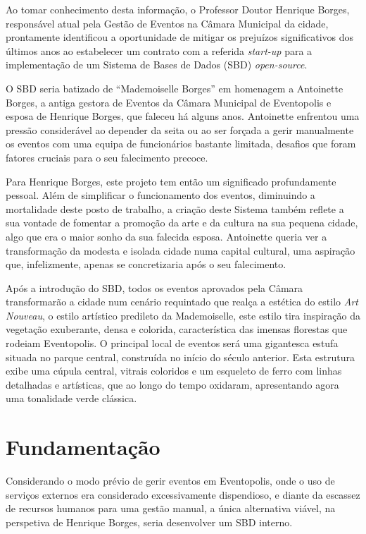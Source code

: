 \documentclass[a4paper,12pt]{scrreprt}
\begin{document}
     Ao tomar conhecimento desta informação, o Professor Doutor Henrique Borges, responsável atual
     pela Gestão de Eventos na Câmara Municipal da cidade, prontamente identificou a
     oportunidade de mitigar os prejuízos significativos dos últimos anos ao estabelecer
     um contrato com a referida \textit{start-up} para a implementação de um Sistema de Bases de Dados (SBD) \textit{open-source}.
    
     O SBD seria batizado de ``Mademoiselle Borges'' em homenagem
     a Antoinette Borges, a antiga gestora de Eventos da Câmara Municipal de Eventopolis
     e esposa de Henrique Borges, que faleceu há alguns anos. Antoinette enfrentou uma pressão
     considerável ao depender da seita ou ao ser forçada a gerir manualmente os eventos com uma
     equipa de funcionários bastante limitada, desafios que foram fatores cruciais para o seu falecimento precoce.
   
     Para Henrique Borges, este projeto tem então um significado profundamente pessoal.
     Além de simplificar o funcionamento dos eventos, diminuindo a mortalidade deste posto de trabalho,
     a criação deste Sistema também reflete a sua vontade de fomentar a promoção da arte e da cultura
     na sua pequena cidade, algo que era o maior sonho da sua falecida esposa.
     Antoinette queria ver a transformação da modesta e isolada cidade numa capital cultural,
     uma aspiração que, infelizmente, apenas se concretizaria após o seu falecimento.
    
     Após a introdução do SBD, todos os eventos aprovados pela Câmara transformarão
     a cidade num cenário requintado que realça a estética do estilo \textit{Art Nouveau},
     o estilo artístico predileto da Mademoiselle, este estilo tira inspiração da vegetação exuberante,
     densa e colorida, característica das imensas florestas que rodeiam Eventopolis.
     O principal local de eventos será uma gigantesca estufa situada no parque central,
     construída no início do século anterior. Esta estrutura exibe uma cúpula central, vitrais coloridos
     e um esqueleto de ferro com linhas detalhadas e artísticas, que ao longo do tempo oxidaram,
     apresentando agora uma tonalidade verde clássica.

    \section{Fundamenta\c{c}\~ao}
    Considerando o modo prévio de gerir eventos em Eventopolis,
    onde o uso de serviços externos era considerado excessivamente dispendioso,
    e diante da escassez de recursos humanos para uma gestão manual, a única alternativa
    viável, na perspetiva de Henrique Borges, seria desenvolver um SBD interno.
\end{document}
